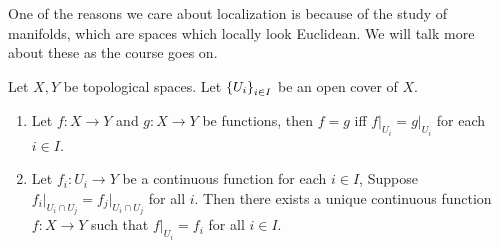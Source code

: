 \documentclass[12pt, twosided]{article}
\begin{document}
  One of the reasons we care about localization is because of the study of manifolds, which are spaces which locally look Euclidean. We will talk more about these as the course goes on.

  \begin{thm}
    Let \(X, Y\) be topological spaces. Let \(\left\{ U_i \right\}_{i \in I}\) be an open cover of \(X\).

    \begin{enumerate}
    \item Let \(f: X \to Y\) and \(g: X \to Y\) be functions, then \(f = g\) iff \(f\vert_{U_i} = g\vert_{U_i}\) for each \(i \in I\).
    \item Let \(f_i : U_i \to Y\) be a continuous function for each \(i \in I\), Suppose \(f_i\vert_{U_i \cap U_j} = f_j\vert_{U_i \cap U_j}\) for all \(i\). Then there exists a unique continuous function \(f: X \to Y\) such that \(f\vert_{U_i} = f_i\) for all \(i \in I\).
    \end{enumerate}
  \end{thm}
\end{document}
